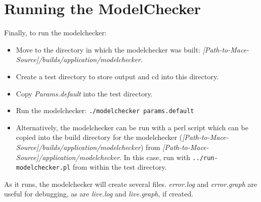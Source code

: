 \documentclass[12pt,letterpaper]{article}
\begin{document}
\section{Running the ModelChecker}
\label{RunningMC}
Finally, to run the modelchecker:
\begin{itemize} 
\item Move to the directory in which the modelchecker was built: \emph{[Path-to-Mace-Source]/builds/application/modelchecker}.
\item Create a test directory to store output and cd into this directory.
\item Copy \emph{Params.default} into the test directory.
\item Run the modelchecker:  \texttt{./modelchecker params.default}
\item Alternatively, the modelchecker can be run with a perl script which can be copied into the build directory for the modelchecker (\emph{[Path-to-Mace-Source]/builds/application/modelchecker}) from \emph{[Path-to-Mace-Source]/application/modelchecker}.  In this case, run with \texttt{../run-modelchecker.pl} from within the test directory.
\end{itemize}

As it runs, the modelchecker will create several files.  \emph{error.log} and \emph{error.graph} are useful for debugging, as are \emph{live.log} and \emph{live.graph}, if created.  
\end{document}
